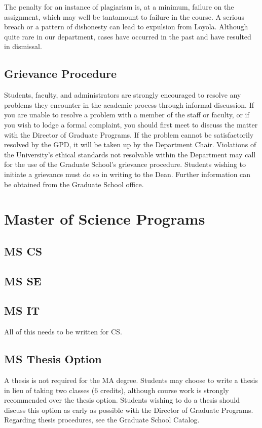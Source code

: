 \documentclass[letterpaper,10pt,english]{sphinxmanual}
\begin{document}
The penalty for an instance of plagiarism is, at a minimum, failure on the assignment, which may well be tantamount to failure in the course. A serious breach or a pattern of dishonesty can lead to expulsion from Loyola. Although quite rare in our department, cases have occurred in the past and have resulted in dismissal.


\section{Grievance Procedure}
\label{regulations:grievance-procedure}
Students, faculty, and administrators are strongly encouraged to resolve any problems they encounter in the academic process through informal discussion. If you are unable to resolve a problem with a member of the staff or faculty, or if you wish to lodge a formal complaint, you should first meet to discuss the matter with the Director of Graduate Programs. If the problem cannot be satisfactorily resolved by the GPD, it will be taken up by the Department Chair. Violations of the University’s ethical standards not resolvable within the Department may call for the use of the Graduate School’s grievance procedure. Students wishing to initiate a grievance must do so in writing to the Dean. Further information can be obtained from the Graduate School office.


\chapter{Master of Science Programs}
\label{ms_programs::doc}\label{ms_programs:master-of-science-programs}

\section{MS CS}
\label{ms_programs:ms-cs}

\section{MS SE}
\label{ms_programs:ms-se}

\section{MS IT}
\label{ms_programs:ms-it}
All of this needs to be written for CS.


\section{MS Thesis Option}
\label{ms_programs:ms-thesis-option}
A thesis is not required for the MA degree. Students may choose to write a thesis in lieu of taking two classes (6 credits), although course work is strongly recommended over the thesis option. Students wishing to do a thesis should discuss this option as early as possible with the Director of Graduate Programs. Regarding thesis procedures, see the Graduate School Catalog.
\end{document}
